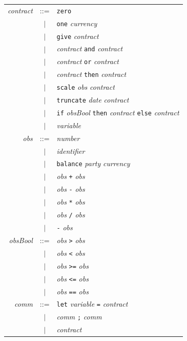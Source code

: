 \documentclass[a4paper, 12pt]{article}
\begin{document}
\begin{center}
\begin{tabular}{r c l}
\textit{contract} & ::= & \texttt{zero} \\
    & $|$ & \texttt{one} \textit{currency} \\
    & $|$ & \texttt{give} \textit{contract} \\
    & $|$ & \textit{contract} \texttt{and} \textit{contract} \\
    & $|$ & \textit{contract} \texttt{or} \textit{contract} \\
    & $|$ & \textit{contract} \texttt{then} \textit{contract} \\
    & $|$ & \texttt{scale} \textit{obs} \textit{contract} \\
    & $|$ & \texttt{truncate} \textit{date} \textit{contract} \\
    & $|$ & \texttt{if} \textit{obsBool} \texttt{then} \textit{contract} \texttt{else} \textit{contract} \\
    & $|$ & \textit{variable} \\[10pt]
\textit{obs} & ::= & \textit{number} \\
    & $|$ & \textit{identifier} \\
    & $|$ & \texttt{balance} \textit{party} \textit{currency} \\
    & $|$ & \textit{obs} \texttt{+} \textit{obs} \\
    & $|$ & \textit{obs} \texttt{-} \textit{obs} \\
    & $|$ & \textit{obs} \texttt{*} \textit{obs} \\
    & $|$ & \textit{obs} \texttt{/} \textit{obs} \\
    & $|$ & \texttt{-} \textit{obs} \\[10pt]
\textit{obsBool} & ::= & \textit{obs} \texttt{>} \textit{obs} \\
    & $|$ & \textit{obs} \texttt{<} \textit{obs} \\
    & $|$ & \textit{obs} \texttt{>=} \textit{obs} \\
    & $|$ & \textit{obs} \texttt{<=} \textit{obs} \\
    & $|$ & \textit{obs} \texttt{==} \textit{obs} \\[10pt]
\textit{comm} & ::= & \texttt{let} \textit{variable} \texttt{=} \textit{contract} \\
    & $|$ & \textit{comm} \texttt{;} \textit{comm} \\
    & $|$ & \textit{contract} \\

\end{tabular}
\end{center}
\end{document}

